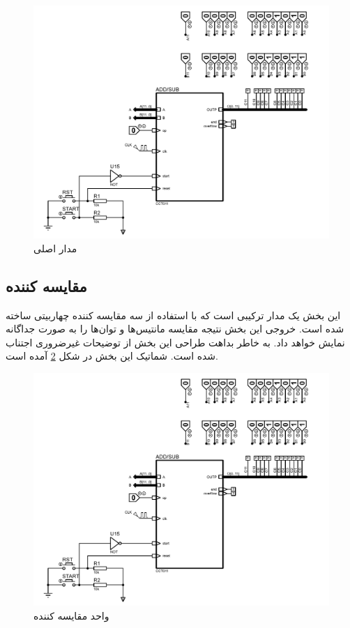 \documentclass{article}
\begin{document}
\begin{figure}
	\centering
	\includegraphics[scale=0.5, page=2]{./graphics/graphics}
	\caption{مدار اصلی}
	\label{main}
\end{figure}

\subsection{مقایسه کننده}
این بخش یک مدار ترکیبی است که با استفاده از سه مقایسه کننده چهاربیتی ساخته شده است. خروجی این بخش نتیجه مقایسه مانتیس‌ها و توان‌ها را به صورت جداگانه نمایش خواهد داد. به خاطر بداهت طراحی این بخش از توضیحات غیرضروری اجتناب شده است. شماتیک این بخش در شکل \ref{comparator} آمده است. 

\begin{figure}
	\centering
	\includegraphics[scale=0.7, page=6]{./graphics/graphics}
	\caption{واحد مقایسه کننده}
	\label{comparator}
\end{figure}
\end{document}
